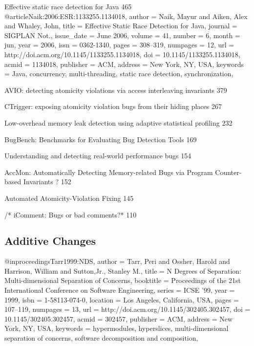 \documentclass[runningheads,a4paper]{llncs}
\begin{document}
Effective static race detection for Java 465
@article{Naik:2006:ESR:1133255.1134018,
 author = {Naik, Mayur and Aiken, Alex and Whaley, John},
 title = {Effective Static Race Detection for Java},
 journal = {SIGPLAN Not.},
 issue_date = {June 2006},
 volume = {41},
 number = {6},
 month = jun,
 year = {2006},
 issn = {0362-1340},
 pages = {308--319},
 numpages = {12},
 url = {http://doi.acm.org/10.1145/1133255.1134018},
 doi = {10.1145/1133255.1134018},
 acmid = {1134018},
 publisher = {ACM},
 address = {New York, NY, USA},
 keywords = {Java, concurrency, multi-threading, static race detection, synchronization},
}


AVIO: detecting atomicity violations via access interleaving invariants 379


CTrigger: exposing atomicity violation bugs from their hiding places 267

Low-overhead memory leak detection using adaptive statistical profiling 232

BugBench: Benchmarks for Evaluating Bug Detection Tools 169

Understanding and detecting real-world performance bugs 154

AccMon: Automatically Detecting Memory-related Bugs via Program Counter-based Invariants ? 152

Automated Atomicity-Violation Fixing 145

/* iComment: Bugs or bad comments?* 110


\subsection{Additive Changes}


@inproceedings{Tarr1999:NDS,
	author = {Tarr, Peri and Ossher, Harold and Harrison, William and Sutton,Jr., Stanley M.},
 title = {N Degrees of Separation: Multi-dimensional Separation of Concerns},
 booktitle = {Proceedings of the 21st International Conference on Software Engineering},
 series = {ICSE '99},
 year = {1999},
 isbn = {1-58113-074-0},
 location = {Los Angeles, California, USA},
 pages = {107--119},
 numpages = {13},
 url = {http://doi.acm.org/10.1145/302405.302457},
 doi = {10.1145/302405.302457},
 acmid = {302457},
 publisher = {ACM},
 address = {New York, NY, USA},
 keywords = {hypermodules, hyperslices, multi-dimensional separation of concerns, software decomposition and composition},
} 
\end{document}
